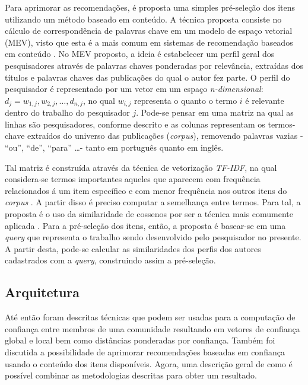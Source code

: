 \documentclass[12pt]{article}
\begin{document}
Para aprimorar as recomendações, é proposta uma simples pré-seleção dos itens utilizando um método baseado em conteúdo. A 
técnica proposta consiste no cálculo de correspondência de palavras chave em um modelo de espaço vetorial (MEV), visto que 
esta é a mais comum em sistemas de recomendação baseados em conteúdo \cite{ricci2011introduction}. No MEV proposto, a ideia é estabelecer um 
perfil geral dos pesquisadores através de palavras chaves ponderadas por relevância, extraídas dos títulos e palavras chaves 
das publicações do qual o autor fez parte. O perfil do pesquisador é representado por um vetor em um espaço \textit{n-dimensional}: 
$d_j = {w_{1,j}, w_{2,j}, \dots ,d_{n,j}}$, no qual $w_{i,j}$ representa o quanto o termo $i$ é relevante dentro do trabalho do 
pesquisador $j$. Pode-se pensar em uma matriz na qual as linhas são pesquisadores, conforme descrito e as colunas representam os 
termos-chave extraídos do universo das publicações (\textit{corpus}), removendo palavras vazias - “ou”, “de”, “para” \dots - 
tanto em português quanto em inglês.

\newpage

Tal matriz é construída através da técnica de vetorização \textit{TF-IDF}, na qual considera-se termos importantes aqueles que 
aparecem com frequência relacionados á um item específico e com menor frequência nos outros itens do \textit{corpus} 
\cite{pazzani2007content}. A partir disso é preciso computar a semelhança entre termos. Para tal, a proposta é o uso da 
similaridade de cossenos por ser a técnica mais comumente aplicada \cite{ricci2011introduction}. Para a pré-seleção dos itens, então, a 
proposta é basear-se em uma \textit{query} que representa o trabalho sendo desenvolvido pelo pesquisador no presente. A partir 
desta, pode-se calcular as similaridades dos perfis dos autores cadastrados com a \textit{query}, construindo assim a pré-seleção.

\subsection{Arquitetura} \label{sect:arch}

Até então foram descritas técnicas que podem ser usadas para a computação de confiança entre membros de uma comunidade resultando 
em vetores de confiança global e local bem como distâncias ponderadas por confiança. Também foi discutida a possibilidade de 
aprimorar recomendações baseadas em confiança usando o conteúdo dos itens disponíveis. Agora, uma descrição geral de como é 
possível combinar as metodologias descritas para obter um resultado. 
\end{document}

